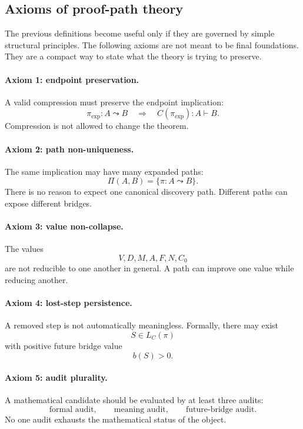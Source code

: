 \documentclass[11pt]{article}
\theoremstyle{definition}
\theoremstyle{remark}
\begin{document}
\subsection{Axioms of proof-path theory}

The previous definitions become useful only if they are governed by simple structural principles.  The following axioms are not meant to be final foundations.  They are a compact way to state what the theory is trying to preserve.

\paragraph{Axiom 1: endpoint preservation.}
A valid compression must preserve the endpoint implication:
\[
        \pi_{\mathrm{exp}}:A\leadsto B
        \quad\Longrightarrow\quad
        C(\pi_{\mathrm{exp}}):A\vdash B.
\]
Compression is not allowed to change the theorem.

\paragraph{Axiom 2: path non-uniqueness.}
The same implication may have many expanded paths:
\[
        \Pi(A,B)=\{\pi:A\leadsto B\}.
\]
There is no reason to expect one canonical discovery path.  Different paths can expose different bridges.

\paragraph{Axiom 3: value non-collapse.}
The values
\[
        V,D,M,A,F,N,C_0
\]
are not reducible to one another in general.  A path can improve one value while reducing another.

\paragraph{Axiom 4: lost-step persistence.}
A removed step is not automatically meaningless.  Formally, there may exist
\[
        S\in L_C(\pi)
\]
with positive future bridge value
\[
        b(S)>0.
\]

\paragraph{Axiom 5: audit plurality.}
A mathematical candidate should be evaluated by at least three audits:
\[
        \text{formal audit},\qquad \text{meaning audit},\qquad \text{future-bridge audit}.
\]
No one audit exhausts the mathematical status of the object.
\end{document}
